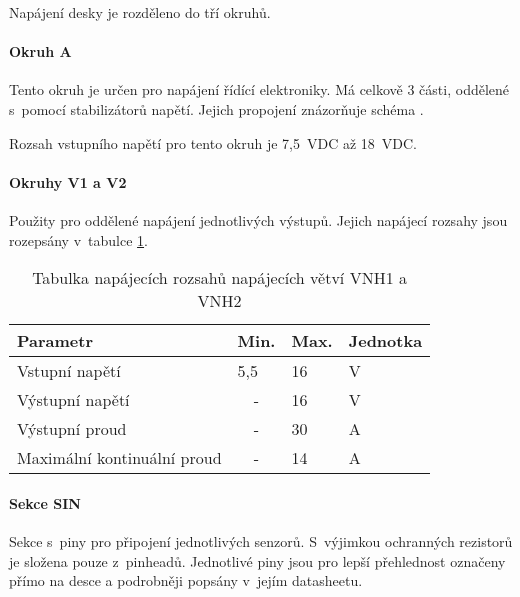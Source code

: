 Napájení desky je rozděleno do tří okruhů. 

\paragraph{Okruh A}
\label{par:PowerCircuitA}
Tento okruh je určen pro napájení řídící elektroniky.
Má celkově 3 části, oddělené s~pomocí stabilizátorů napětí.
Jejich propojení znázorňuje schéma .

Rozsah vstupního napětí pro tento okruh je 7,5~VDC až 18~VDC.

\paragraph{Okruhy V1 a V2}
Použity pro oddělené napájení jednotlivých výstupů. 
Jejich napájecí rozsahy jsou rozepsány v~tabulce \ref{fig:powerSourceCharsVNH}.

\begin{table}[h]
    \centering
    \begin{tabular}{llll}
        \hline
        \multicolumn{1}{|l|}{\textbf{Parametr}}           & \multicolumn{1}{l|}{\textbf{Min.}} & \multicolumn{1}{l|}{\textbf{Max.}} & \multicolumn{1}{l|}{\textbf{Jednotka}} \\ \hline
        \multicolumn{1}{|l|}{Vstupní napětí}              & \multicolumn{1}{l|}{5,5}           & \multicolumn{1}{l|}{16}            & \multicolumn{1}{l|}{V}                 \\ \hline
        \multicolumn{1}{|l|}{Výstupní napětí}             & \multicolumn{1}{c|}{-}             & \multicolumn{1}{l|}{16}            & \multicolumn{1}{l|}{V}                 \\ \hline
        \multicolumn{1}{|l|}{Výstupní proud}              & \multicolumn{1}{c|}{-}             & \multicolumn{1}{l|}{30}            & \multicolumn{1}{l|}{A}                 \\ \hline
        \multicolumn{1}{|l|}{Maximální kontinuální proud} & \multicolumn{1}{c|}{-}             & \multicolumn{1}{l|}{14}            & \multicolumn{1}{l|}{A}                 \\ \hline
    \end{tabular}
    \caption{Tabulka napájecích rozsahů napájecích větví VNH1 a VNH2}
    \label{fig:powerSourceCharsVNH}
\end{table}

\paragraph{Sekce SIN}
Sekce s~piny pro připojení jednotlivých senzorů. 
S~výjimkou ochranných rezistorů je složena pouze z~pinheadů.
Jednotlivé piny jsou pro lepší přehlednost označeny přímo na desce a podrobněji popsány v~jejím datasheetu. 

